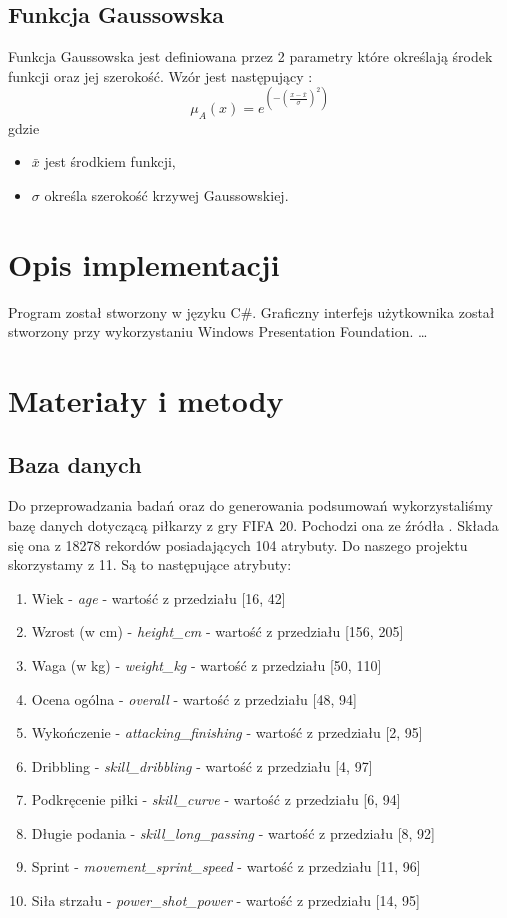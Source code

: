 \documentclass{classrep}
\begin{document}
	
	
	
	\subsection{Funkcja Gaussowska} 
	Funkcja Gaussowska jest definiowana przez 2 parametry które określają środek funkcji oraz jej szerokość. Wzór jest następujący \cite{kul}:
	\begin{equation}
		\mu_A(x) = e^{(-(\frac{x - \bar{x}}{\sigma})^2)}
	\end{equation}
	gdzie 
	\begin{itemize}
		\item $\bar{x}$ jest środkiem funkcji,
		\item $\sigma$ określa szerokość krzywej Gaussowskiej. 
	\end{itemize}
	
	\section{Opis implementacji} %
	Program został stworzony w języku C\#. Graficzny interfejs użytkownika został stworzony przy wykorzystaniu Windows Presentation Foundation. \ldots 
	
	\section{Materiały i metody} %
	\subsection{Baza danych}
	Do przeprowadzania badań oraz do generowania podsumowań wykorzystaliśmy bazę danych dotyczącą piłkarzy z gry FIFA 20. Pochodzi ona ze źródła \cite{baza}. Składa się ona z 18278 rekordów posiadających 104 atrybuty. Do naszego projektu skorzystamy z 11. Są to następujące atrybuty:
	
	\begin{enumerate}
		\item Wiek - \textsl{age} - wartość z przedziału [16, 42]
		\item Wzrost (w cm) - \textsl{height\_cm} - wartość z przedziału [156, 205]
		\item Waga (w kg) - \textsl{weight\_kg} - wartość z przedziału [50, 110]
		\item Ocena ogólna - \textsl{overall} - wartość z przedziału [48, 94]
		\item Wykończenie - \textsl{attacking\_finishing} - wartość z przedziału [2, 95]
		\item Dribbling - \textsl{skill\_dribbling} - wartość z przedziału [4, 97]
		\item Podkręcenie piłki - \textsl{skill\_curve} - wartość z przedziału [6, 94]
		\item Długie podania - \textsl{skill\_long\_passing} - wartość z przedziału [8, 92]
		\item Sprint - \textsl{movement\_sprint\_speed} - wartość z przedziału [11, 96]
		\item Siła strzału - \textsl{power\_shot\_power} - wartość z przedziału [14, 95]
	\end{enumerate}
\end{document}
